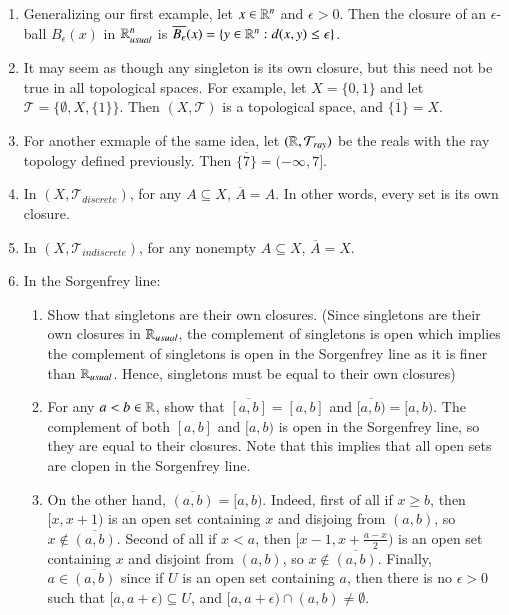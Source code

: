 \documentclass[12pt, a4paper, oneside, openright, titlepage]{book}
\begin{document}
\begin{example}
\begin{enumerate}
\begin{proof}
\begin{enumerate}
                \end{enumerate}
            \end{proof}
        \item Generalizing our first example, let $x\in\mathbb R^n$ and $\epsilon > 0$. Then the closure of an $\epsilon$-ball $B_{\epsilon}(x)$ in $\mathbb R^n_{usual}$ is $\overline{B_{\epsilon}}(x) = \{y\in \mathbb R^n:d(x,y)\leq \epsilon\}$.
        \item It may seem as though any singleton is its own closure, but this need not be true in all topological spaces. For example, let $X = \{0,1\}$ and let $\mathcal{T} = \{\emptyset, X, \{1\}\}$. Then $(X,\mathcal{T})$ is a topological space, and $\overline{\{1\}} = X$. 
        \item For another exmaple of the same idea, let $(\mathbb R,\mathcal{T}_{ray})$ be the reals with the ray topology defined previously. Then $\overline{\{7\}} = (-\infty,7]$. 
        \item In $(X,\mathcal{T}_{discrete})$, for any $A \subseteq X$, $\overline{A} = A$. In other words, every set is its own closure.
        \item In $(X,\mathcal{T}_{indiscrete})$, for any nonempty $A \subseteq X$, $\overline{A} = X$.
        \item In the Sorgenfrey line:\begin{enumerate}
                \item Show that singletons are their own closures. (Since singletons are their own closures in $\mathbb R_{usual}$, the complement of singletons is open which implies the complement of singletons is open in the Sorgenfrey line as it is finer than $\mathbb R_{usual}$. Hence, singletons must be equal to their own closures)
                \item For any $a<b \in \mathbb R$, show that $\overline{[a,b]} = [a,b]$ and $\overline{[a,b)} = [a,b)$. The complement of both $[a,b]$ and $[a,b)$ is open in the Sorgenfrey line, so they are equal to their closures. Note that this implies that all open sets are clopen in the Sorgenfrey line.
                \item On the other hand, $\overline{(a,b)} = [a,b)$. Indeed, first of all if $x \geq b$, then $[x,x+1)$ is an open set containing $x$ and disjoing from $(a,b)$, so $x \notin \overline{(a,b)}$. Second of all if $x < a$, then $[x-1, x+\frac{a-x}{2})$ is an open set containing $x$ and disjoint from $(a,b)$, so $x \notin \overline{(a,b)}$. Finally, $a \in \overline{(a,b)}$ since if $U$ is an open set containing $a$, then there is no $\epsilon > 0$ such that $[a,a+\epsilon) \subseteq U$, and $[a,a+\epsilon)\cap(a,b) \neq \emptyset$.

\end{enumerate}
\end{enumerate}
\end{example}
\end{document}
